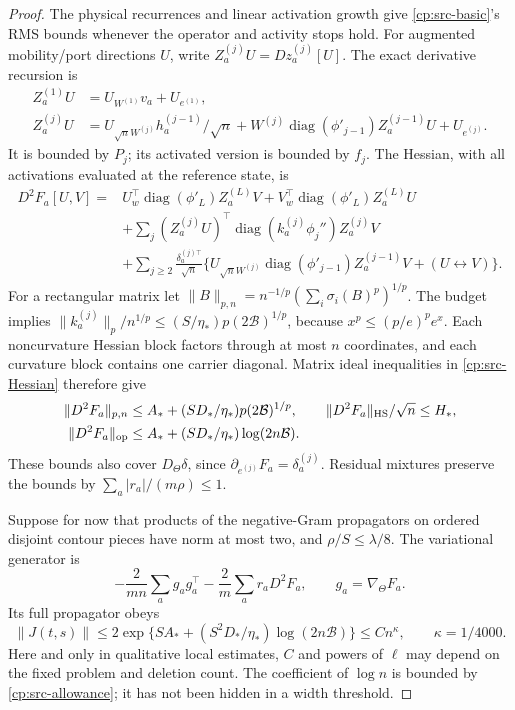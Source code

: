 \begin{proof}
The physical recurrences and linear activation growth give
\eqref{cp:src-basic}'s RMS bounds whenever the operator and activity
stops hold.  For augmented mobility/port directions \(U\), write
\(Z_a^{(j)}U=Dz_a^{(j)}[U]\).  The exact derivative recursion is
\begin{align}
 Z_a^{(1)}U&=U_{W^{(1)}}v_a+U_{e^{(1)}},\nonumber\\
 Z_a^{(j)}U&=U_{\sqrt nW^{(j)}}h_a^{(j-1)}/\sqrt n
       +W^{(j)}\operatorname{diag}(\phi'_{j-1})Z_a^{(j-1)}U
       +U_{e^{(j)}}. \label{cp:src-first-derivative}
\end{align}
It is bounded by \(P_j\); its activated version is bounded by \(f_j\).
The Hessian, with all activations evaluated at the reference state, is
\begin{align}
 D^2F_a[U,V]={}&U_w^\top\operatorname{diag}(\phi'_L)Z_a^{(L)}V
 +V_w^\top\operatorname{diag}(\phi'_L)Z_a^{(L)}U\nonumber\\
 &+\sum_j(Z_a^{(j)}U)^\top
       \operatorname{diag}(k_a^{(j)}\phi_j'')Z_a^{(j)}V\nonumber\\
 &+\sum_{j\ge2}\frac{\delta_a^{(j)\top}}{\sqrt n}
 \{U_{\sqrt nW^{(j)}}\operatorname{diag}(\phi'_{j-1})Z_a^{(j-1)}V
 +(U\leftrightarrow V)\}. \label{cp:src-Hessian}
\end{align}
For a rectangular matrix let
\(\|B\|_{p,n}=n^{-1/p}(\sum_i\sigma_i(B)^p)^{1/p}\).
The budget implies
\(\|k_a^{(j)}\|_p/n^{1/p}\le(S/\eta_*)p(2\mathcal B)^{1/p}\),
because \(x^p\le(p/e)^pe^x\).  Each noncurvature Hessian block
factors through at most \(n\) coordinates, and each curvature block
contains one carrier diagonal.  Matrix ideal inequalities in
\eqref{cp:src-Hessian} therefore give
\begin{align}
 \|D^2F_a\|_{p,n}&\le A_*+(SD_*/\eta_*)p(2\mathcal B)^{1/p},
 \qquad \|D^2F_a\|_{\rm HS}/\sqrt n\le H_*,\nonumber\\
 \|D^2F_a\|_{\rm op}&\le A_*+(SD_*/\eta_*)\log(2n\mathcal B).
 \label{cp:src-Schatten}
\end{align}
These bounds also cover \(D_\Theta\delta\), since
\(\partial_{e^{(j)}}F_a=\delta_a^{(j)}\).  Residual mixtures
preserve the bounds by \(\sum_a|r_a|/(m\rho)\le1\).

Suppose for now that products of the negative-Gram propagators on
ordered disjoint contour pieces have norm at most two, and
\(\rho/S\le\lambda/8\).  The variational generator is
\[
 -\frac2{mn}\sum_ag_ag_a^\top-\frac2m\sum_ar_aD^2F_a,
 \qquad g_a=\nabla_\Theta F_a.
\]
Its full propagator obeys
\begin{equation}
 \|J(t,s)\|\le2\exp\{SA_*+(S^2D_*/\eta_*)\log(2n\mathcal B)\}
 \le Cn^{\kappa},\qquad \kappa=1/4000.
 \label{cp:src-propagator}
\end{equation}
Here and only in qualitative local estimates, \(C\) and powers of
\(\ell\) may depend on the fixed problem and deletion count.
The coefficient of \(\log n\) is bounded by
\eqref{cp:src-allowance}; it has not been hidden in a width threshold.


\end{proof}
